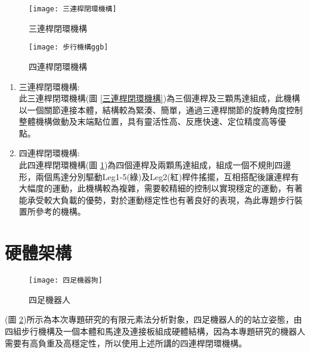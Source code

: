 \begin{figure}[htbp]
  \begin{minipage}[t]{0.5\linewidth}
    \centering
    \texttt{[image: 三連桿閉環機構]}
    \caption{三連桿閉環機構}
    \label{三連桿閉環機構}
  \end{minipage}
  \hfill
  \begin{minipage}[t]{0.4\linewidth}
    \centering
    \texttt{[image: 步行機構ggb]}
    \caption{四連桿閉環機構}
    \label{步行機構ggb}
  \end{minipage}
\end{figure}

\begin{enumerate}
\item 三連桿閉環機構:\\

此三連桿閉環機構(圖 \ref{三連桿閉環機構})為三個連桿及三顆馬達組成，此機構以一個關節連接本體，結構較為緊湊、簡單，通過三連桿關節的旋轉角度控制整體機構做動及末端點位置，具有靈活性高、反應快速、定位精度高等優點。\

\item 四連桿閉環機構:\\

此四連桿閉環機構(圖 \ref{步行機構ggb})為四個連桿及兩顆馬達組成，組成一個不規則四邊形，兩個馬達分別驅動Leg1-5(綠)及Leg2(紅)桿件搖擺，互相搭配後讓連桿有大幅度的運動，此機構較為複雜，需要較精細的控制以實現穩定的運動，有著能承受較大負載的優勢，對於運動穩定性也有著良好的表現，為此專題步行裝置所參考的機構。\\
\end{enumerate}

\section{硬體架構}
\begin{figure}[hbtp]
\begin{center}
\texttt{[image: 四足機器狗]}
\caption{\Large 四足機器人}\label{四足機器狗}
\end{center}
\end{figure}

(圖 \ref{四足機器狗})所示為本次專題研究的有限元素法分析對象，四足機器人的的站立姿態，由四組步行機構及一個本體和馬達及連接板組成硬體結構，因為本專題研究的機器人需要有高負重及高穩定性，所以使用上述所講的四連桿閉環機構。\

\newpage

